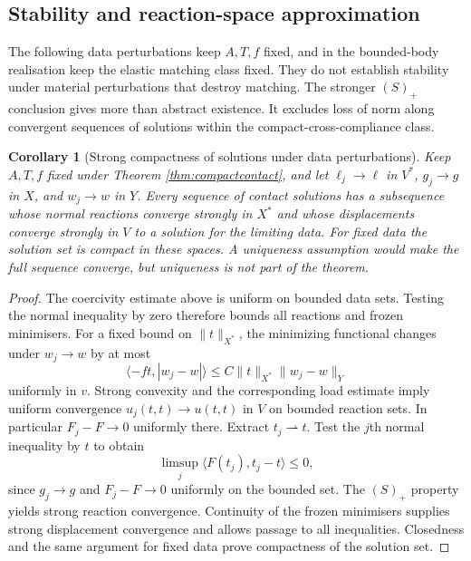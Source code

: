 \documentclass[11pt,a4paper]{article}
\newtheorem{corollary}[theorem]{Corollary}
\theoremstyle{definition}\newtheorem{definition}[theorem]{Definition}
\theoremstyle{remark}\newtheorem{remark}[theorem]{Remark}
\newcommand{\ip}[2]{\langle #1,#2\rangle}
\newcommand{\weak}{\rightharpoonup}
\numberwithin{equation}{section}
\begin{document}
\subsection{Stability and reaction-space approximation}
The following data perturbations keep $A,T,f$ fixed, and in the bounded-body realisation keep the elastic matching class fixed. They do not establish stability under material perturbations that destroy matching.
The stronger $(S)_+$ conclusion gives more than abstract existence. It excludes loss of norm along convergent sequences of solutions within the compact-cross-compliance class.

\begin{corollary}[Strong compactness of solutions under data perturbations]\label{cor:datastability}
Keep $A,T,f$ fixed under Theorem \ref{thm:compactcontact}, and let $\ell_j\to\ell$ in $V^*$, $g_j\to g$ in $X$, and $w_j\to w$ in $Y$. Every sequence of contact solutions has a subsequence whose normal reactions converge strongly in $X^*$ and whose displacements converge strongly in $V$ to a solution for the limiting data. For fixed data the solution set is compact in these spaces. A uniqueness assumption would make the full sequence converge, but uniqueness is not part of the theorem.
\end{corollary}
\begin{proof}
The coercivity estimate above is uniform on bounded data sets. Testing the normal inequality by zero therefore bounds all reactions and frozen minimisers. For a fixed bound on $\|t\|_{X^*}$, the minimizing functional changes under $w_j\to w$ by at most
\[
 \ip{-ft}{|w_j-w|}\le C\|t\|_{X^*}\|w_j-w\|_Y
\]
uniformly in $v$. Strong convexity and the corresponding load estimate imply uniform convergence $u_j(t,t)\to u(t,t)$ in $V$ on bounded reaction sets. In particular $F_j-F\to0$ uniformly there.
Extract $t_j\weak t$. Test the $j$th normal inequality by $t$ to obtain
\[
 \limsup_j\ip{F(t_j)}{t_j-t}\le0,
\]
since $g_j\to g$ and $F_j-F\to0$ uniformly on the bounded set. The $(S)_+$ property yields strong reaction convergence. Continuity of the frozen minimisers supplies strong displacement convergence and allows passage to all inequalities. Closedness and the same argument for fixed data prove compactness of the solution set.
\end{proof}
\end{document}
